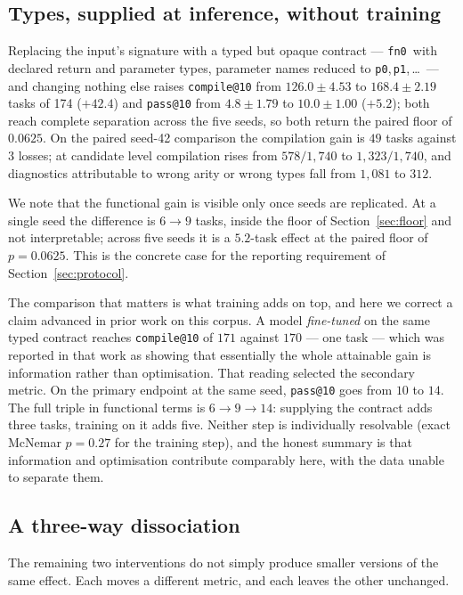 \documentclass[conference]{IEEEtran}
\makeatletter
\newcommand{\passat}[1]{\texttt{pass@#1}\xspace}
\newcommand{\compileat}[1]{\texttt{compile@#1}\xspace}
\newcommand{\fnz}{\texttt{fn0}\xspace}
\makeatother
\begin{document}
\subsection{Types, supplied at inference, without training}
Replacing the input's signature with a typed but opaque contract --- \fnz\ with
declared return and parameter types, parameter names reduced to
\texttt{p0},\,\texttt{p1},\,\ldots\ --- and changing nothing else raises
\compileat{10} from $126.0\pm4.53$ to $168.4\pm2.19$ tasks of 174
($+42.4$) and \passat{10} from $4.8\pm1.79$ to $10.0\pm1.00$
($+5.2$); both reach complete separation across the five seeds, so both return
the paired floor of $0.0625$. On the paired seed-42 comparison the compilation gain
is $49$ tasks against $3$ losses; at candidate level compilation rises from
$578/1{,}740$ to $1{,}323/1{,}740$, and diagnostics attributable to wrong arity
or wrong types fall from $1{,}081$ to $312$.

We note that the functional gain is visible only once seeds are replicated. At a
single seed the difference is $6\rightarrow9$ tasks, inside the floor of
Section~\ref{sec:floor} and not interpretable; across five seeds it is a
$5.2$-task effect at the paired floor of $p{=}0.0625$. This is the concrete case for the
reporting requirement of Section~\ref{sec:protocol}.

The comparison that matters is what training adds on top, and here we correct a
claim advanced in prior work on this corpus. A model \emph{fine-tuned} on the same typed
contract reaches \compileat{10} of $171$ against $170$ --- one task --- which was
reported in that work as showing that essentially the whole attainable gain is
information rather than optimisation. That reading selected the secondary metric.
On the primary endpoint at the same seed, \passat{10} goes from $10$ to $14$. The
full triple in functional terms is $6\rightarrow9\rightarrow14$: supplying the
contract adds three tasks, training on it adds five. Neither step is individually
resolvable (exact McNemar $p{=}0.27$ for the training step), and the honest
summary is that information and optimisation contribute comparably here, with the
data unable to separate them.

\subsection{A three-way dissociation}
The remaining two interventions do not simply produce smaller versions of the
same effect. Each moves a different metric, and each leaves the other unchanged.
\end{document}
